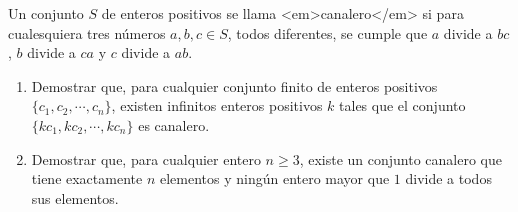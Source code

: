 Un conjunto $S$ de enteros positivos se llama <em>canalero</em> si para cualesquiera tres números $a,b,c \in S$, todos diferentes, se cumple que $a$ divide a $bc$, $b$ divide a $ca$ y $c$ divide a $ab$.
\begin{enumerate}
   \item  Demostrar que, para cualquier conjunto finito de enteros positivos $\{c_1,c_2, \cdots , c_n\}$, existen infinitos enteros positivos $k$ tales que el conjunto $\{ kc_1, kc_2, \cdots , kc_n \}$ es canalero.
   \item  Demostrar que, para cualquier entero $n \geq 3$, existe un conjunto canalero que tiene exactamente $n$ elementos y ningún entero mayor que $1$ divide a todos sus elementos.
 \end{enumerate} 
